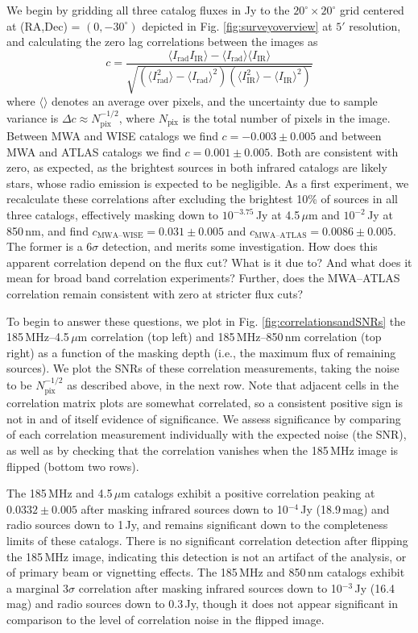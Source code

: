 \documentclass[numberedappendix]{emulateapj}
\newcommand{\rad}{\text{rad}}
\newcommand{\IR}{\text{IR}}
\begin{document}
We begin by gridding all three catalog fluxes in Jy to the $20^\circ\times20^\circ$ grid centered at (RA,Dec) = $(0, -30^\circ)$ depicted in Fig. \ref{fig:surveyoverview} at $5'$ resolution, and calculating the zero lag correlations between the images as
\begin{equation}
\label{eqn:imagecorrdef}
	c = \frac{\langle I_\rad I_\IR\rangle-\langle I_\rad\rangle\langle I_\IR\rangle}{\sqrt{(\langle I_\rad^2\rangle -\langle I_\rad\rangle^2)(\langle I_\IR^2\rangle -\langle I_\IR\rangle^2)}}
\end{equation}
where $\langle\rangle$ denotes an average over pixels, and the uncertainty due to sample variance is $\Delta c\approx N_\text{pix}^{-1/2}$, where $N_\text{pix}$ is the total number of pixels in the image. Between MWA and WISE catalogs we find $c=-0.003\pm0.005$ and between MWA and ATLAS catalogs we find $c=0.001\pm0.005$. Both are consistent with zero, as expected, as the brightest sources in both infrared catalogs are likely stars, whose radio emission is expected to be negligible. As a first experiment, we recalculate these correlations after excluding the brightest 10\% of sources in all three catalogs, effectively masking down to $10^{-3.75}$\,Jy at 4.5\,$\mu$m and $10^{-2}$\,Jy at 850\,nm, and find $c_\text{MWA--WISE}=0.031\pm0.005$ and $c_\text{MWA--ATLAS}=0.0086\pm0.005$. The former is a $6\sigma$ detection, and merits some investigation. How does this apparent correlation depend on the flux cut? What is it due to? And what does it mean for broad band correlation experiments? Further, does the MWA--ATLAS correlation remain consistent with zero at stricter flux cuts?

To begin to answer these questions, we plot in Fig. \ref{fig:correlationsandSNRs} the 185\,MHz--4.5\,$\mu$m correlation (top left) and 185\,MHz--850\,nm correlation (top right) as a function of the masking depth (i.e., the maximum flux of remaining sources). We plot the SNRs of these correlation measurements, taking the noise to be $N_\text{pix}^{-1/2}$ as described above, in the next row. Note that adjacent cells in the correlation matrix plots are somewhat correlated, so a consistent positive sign is not in and of itself evidence of significance. We assess significance by comparing of each correlation measurement individually with the expected noise (the SNR), as well as by checking that the correlation vanishes when the 185\,MHz image is flipped (bottom two rows). 

The 185\,MHz and 4.5\,$\mu$m catalogs exhibit a positive correlation peaking at $0.0332\pm0.005$ after masking infrared sources down to 10$^{-4}$\,Jy (18.9\,mag) and radio sources down to 1\,Jy, and remains significant down to the completeness limits of these catalogs. There is no significant correlation detection after flipping the 185\,MHz image, indicating this detection is not an artifact of the analysis, or of primary beam or vignetting effects. The 185\,MHz and 850\,nm catalogs exhibit a marginal $3\sigma$ correlation after masking infrared sources down to 10$^{-3}$\,Jy (16.4\,mag) and radio sources down to 0.3\,Jy, though it does not appear significant in comparison to the level of correlation noise in the flipped image.
\end{document}
